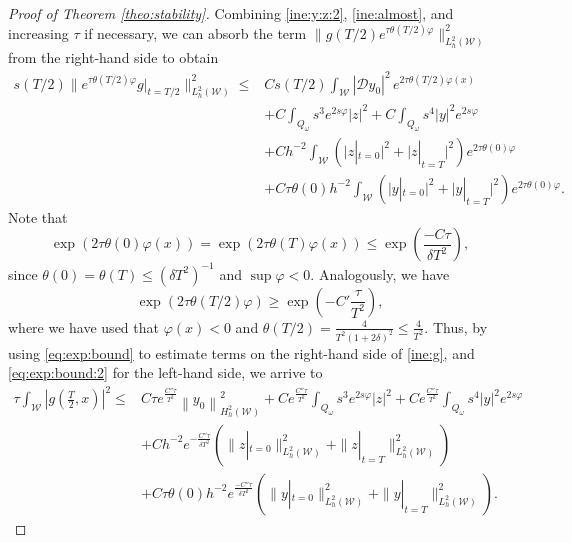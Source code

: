 \documentclass{amsart}
\numberwithin{equation}{section}
\begin{document}
\begin{proof}[Proof of Theorem \ref{theo:stability}]
Combining \eqref{ine:y:z:2}, \eqref{ine:almost},
and increasing $\tau$ if necessary, we can absorb the term \break $\|g(T/2)e^{\tau\theta(T/2)\varphi}\|^{2}_{L^{2}_{h}(\mathcal{W})}$ from the right-hand side to obtain 
\begin{equation}\label{ine:g}
\begin{aligned}
    s(T/2)\|e^{\tau\theta(T/2)\varphi}g|_{t=T/2}\|^{2}_{L^{2}_{h}(\mathcal{W})}\leq &Cs(T/2)\int_{\mathcal{W}}|\mathcal{D}y_{0}|^2\,e^{2\tau\theta(T/2)\varphi(x)}\\
    &+C\int_{Q_{\omega}}s^{3}e^{2s\varphi}|z|^{2}+C\int_{Q_{ \omega}}s^{4}|y|^{2}e^{2s\varphi}\\
&+Ch^{-2}\int_{\mathcal{W}}\left(\Big|z|
_{t=0}\Big|^2+\Big|z|_{t=T}\Big|^{2}\right)e^{2\tau\theta(0)\varphi}\\
&+C\tau\theta(0)h^{-2}\int_{\mathcal{W}}\left(\Big|y|_{t=0}\Big|^{2}+\Big|y|_{t=T}\Big|^{2}\right)e^{2\tau\theta(0)\varphi}.
\end{aligned}
\end{equation}
Note that 
\begin{equation}\label{eq:exp:bound}
    \exp\left( 2\tau\theta(0)\varphi(x)\right)=\exp\left( 2\tau\theta(T)\varphi(x)\right)\leq \exp\left(\frac{-C\tau}{\delta T^{2}} \right),
\end{equation} since $\theta(0)=\theta(T)\leq (\delta T^{2})^{-1}$ and $\sup \varphi <0$. Analogously, we have
\begin{equation}\label{eq:exp:bound:2}
\exp\left(2\tau\theta(T/2)\varphi\right)\geq \exp\left(-C'\frac{\tau}{T^{2}}\right),
\end{equation} 
where we have used that $\varphi(x) <0$ and $\theta(T/2)=\frac{4}{T^{2}(1+2\delta)^{2}}\leq \frac{4}{T^{2}}$. Thus, by using \eqref{eq:exp:bound} to estimate terms on the right-hand side of \eqref{ine:g}, and \eqref{eq:exp:bound:2} for the left-hand side, we arrive to
\begin{equation}\label{ine:g:2}
\begin{aligned}
    \tau\int_{\mathcal{W}}\left|g\left( \frac{T}{2},x\right)\right|^{2}\leq &C\tau e^{\frac{C''\tau}{T^{2}}}\left\| y_{0}\right\|^{2}_{H_h^{2}(\mathcal{W})}+Ce^{\frac{C''\tau}{T^{2}}}\int_{Q_{\omega}}s^{3}e^{2s\varphi}|z|^{2}+Ce^{\frac{C''\tau}{T^{2}}}\int_{Q_{ \omega}}s^{4}|y|^{2}e^{2s\varphi}\\
&+Ch^{-2}e^{-\frac{C''\tau}{\delta T^{2}}}\left(\|z|_{t=0}\|_{L^2_h(\mathcal{W})}^2+\|z|_{t=T}\|_{L^2_h(\mathcal{W})}^2\right)\\
&+C\tau\theta(0)h^{-2}e^{\frac{-C''\tau}{\delta T^{2}}}\left(\|y|_{t=0}\|_{L^2_h(\mathcal{W})}^2+\|y|_{t=T}\|_{L^2_h(\mathcal{W})}^2\right).
\end{aligned}
\end{equation}


\end{proof}
\end{document}
